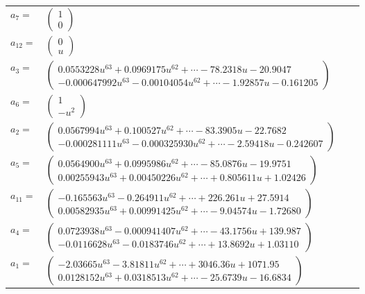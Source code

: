 \documentclass[1p]{elsarticle_modified}
\theoremstyle{definition}
\begin{document}
\begin{tabular}{m{7pt} m{180pt} m{7pt} m{180pt} }
\flushright $a_{7}=$&$\begin{pmatrix}1\\0\end{pmatrix}$ \\
\flushright $a_{12}=$&$\begin{pmatrix}0\\u\end{pmatrix}$ \\
\flushright $a_{3}=$&$\begin{pmatrix}0.0553228 u^{63}+0.0969175 u^{62}+\cdots-78.2318 u-20.9047\\-0.000647992 u^{63}-0.00104054 u^{62}+\cdots-1.92857 u-0.161205\end{pmatrix}$ \\
\flushright $a_{6}=$&$\begin{pmatrix}1\\- u^2\end{pmatrix}$ \\
\flushright $a_{2}=$&$\begin{pmatrix}0.0567994 u^{63}+0.100527 u^{62}+\cdots-83.3905 u-22.7682\\-0.000281111 u^{63}-0.000325930 u^{62}+\cdots-2.59418 u-0.242607\end{pmatrix}$ \\
\flushright $a_{5}=$&$\begin{pmatrix}0.0564900 u^{63}+0.0995986 u^{62}+\cdots-85.0876 u-19.9751\\0.00255943 u^{63}+0.00450226 u^{62}+\cdots+0.805611 u+1.02426\end{pmatrix}$ \\
\flushright $a_{11}=$&$\begin{pmatrix}-0.165563 u^{63}-0.264911 u^{62}+\cdots+226.261 u+27.5914\\0.00582935 u^{63}+0.00991425 u^{62}+\cdots-9.04574 u-1.72680\end{pmatrix}$ \\
\flushright $a_{4}=$&$\begin{pmatrix}0.0723938 u^{63}-0.000941407 u^{62}+\cdots-43.1756 u+139.987\\-0.0116628 u^{63}-0.0183746 u^{62}+\cdots+13.8692 u+1.03110\end{pmatrix}$ \\
\flushright $a_{1}=$&$\begin{pmatrix}-2.03665 u^{63}-3.81811 u^{62}+\cdots+3046.36 u+1071.95\\0.0128152 u^{63}+0.0318513 u^{62}+\cdots-25.6739 u-16.6834\end{pmatrix}$ \\

\end{tabular}
\end{document}
